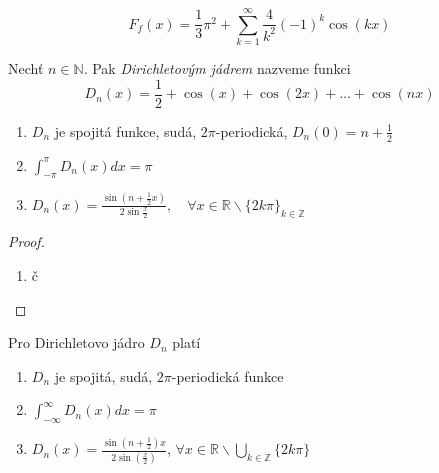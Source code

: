 $$F_f(x) = \frac{1}{3} \pi^2 + \sum_{k=1}^{\infty} \frac{4}{k^2} (-1)^k \cos (kx)$$

\begin{definice}
Nechť $n \in \mathbb{N}$. Pak \emph{Dirichletovým jádrem} nazveme funkci
$$D_n(x) = \frac{1}{2}+\cos(x)+\cos(2x)+\ldots+\cos(nx)$$
\end{definice}

\begin{dusledek}
\begin{enumerate}
\item $D_n$ je spojitá funkce, sudá, $2 \pi$-periodická, $D_n(0) = n + \frac{1}{2}$
\item $\int_{-\pi}^\pi D_n(x) dx = \pi$
\item $D_n(x) = \frac{\sin \left( n + \frac{1}{2} x \right)}{2 \sin \frac{x}{2}}, \quad \forall x \in \mathbb{R} \backslash \{ 2 k \pi \}_{k \in \mathbb{Z}}$
\end{enumerate}
\end{dusledek}

\begin{proof}
\begin{enumerate}
\item č
\end{enumerate}
\end{proof}

\begin{vetal}
Pro Dirichletovo jádro $D_n$ platí
\begin{enumerate}
\item $D_n$ je spojitá, sudá, $2 \pi$-periodická funkce
\item $\int_{-\infty}^{\infty} D_n (x) dx = \pi$
\item $D_n(x) = \frac{\sin \left( n + \frac{1}{2} \right) x}{2 \sin \left( \frac{x}{2} \right)}$, $\forall x \in \mathbb{R} \backslash \bigcup_{k \in \mathbb{Z}} \{ 2k \pi \}$
\end{enumerate}
\end{vetal}

